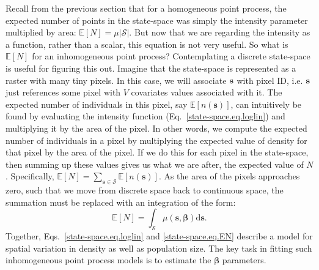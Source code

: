 Recall from the previous section that for a homogeneous point process,
the expected number of points in the state-space was simply the
intensity parameter multiplied by area: $\mathbb{E}[N] =
\mu|\mathcal{S}|$. But now that we are regarding the intensity as a
function, rather than a scalar, this equation is not very useful. So
what is $\mathbb{E}[N]$ for an inhomogeneous point process?
Contemplating a discrete state-space is useful for figuring this
out. Imagine that the state-space is represented as a raster with many
tiny pixels. In this case, we will associate
$\bf s$ with pixel ID, i.e. $\bf s$ just references some pixel with
$V$ covariates values associated with it. The expected number of
individuals in this pixel, say $\mathbb{E}[n(\mathbf{s})]$, can intuitively be
found by evaluating the intensity function
(Eq.~\ref{state-space.eq.loglin}) and multiplying it by the area of
the pixel. In other words, we compute the expected number of
individuals in a pixel by multiplying the expected value of density
for that pixel by the area of the pixel. If we do this for each pixel in the state-space, then
summing up these values gives us what we are after, the expected value
of $N$. Specifically,
$\mathbb{E}[N] = \sum_{\mathbf{s} \in \mathcal{S}}
\mathbb{E}[n(\mathbf{s})]$.
As the area of the pixels approaches zero, such that we move from discrete
space back to continuous space, the summation must be replaced
with an integration of the form:
\begin{equation}
\mathbb{E}[N] = \int_{\mathcal{S}} \mu(\mathbf{s}, {\bm \beta}) \mathrm{d}\mathbf{s}.
\label{state-space.eq.EN}
\end{equation}
Together, Eqs.~\ref{state-space.eq.loglin} and \ref{state-space.eq.EN}
describe a model for spatial variation in density as well as
population size. The key task in fitting such inhomogeneous point
process models is to estimate the $\bm \beta$
parameters.


